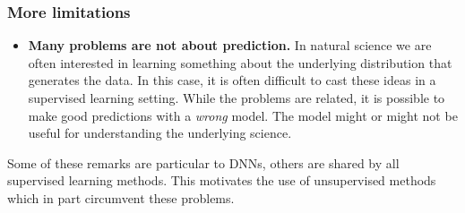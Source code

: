 \documentclass{beamer}
\begin{document}
\begin{frame}
\frametitle{More limitations}

\begin{itemize}
\item \textbf{Many problems are not about prediction.} In natural science we are often interested in learning something about the underlying distribution that generates the data. In this case, it is often difficult to cast these ideas in a supervised learning setting. While the problems are related, it is possible to make good predictions with a \emph{wrong} model. The model might or might not be useful for understanding the underlying science.
\end{itemize}

\noindent
Some of these remarks are particular to DNNs, others are shared by all supervised learning methods. This motivates the use of unsupervised methods which in part circumvent these problems.
\end{frame}
\end{document}
